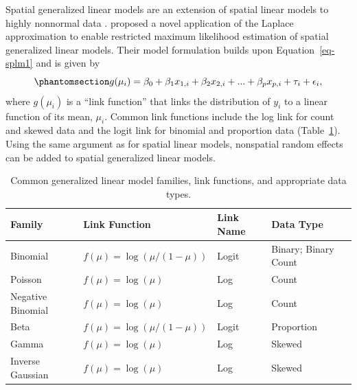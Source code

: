 \documentclass[
  letterpaper,
  DIV=11,
  numbers=noendperiod]{scrartcl}
\begin{document}
Spatial generalized linear models are an extension of spatial linear
models to highly nonnormal data
\citep{christensen2002bayesian, zhang2002estimation, diggle2007model, bonat2016practical}.
\citet{verhoef2024marginal} proposed a novel application of the Laplace
approximation to enable restricted maximum likelihood estimation of
spatial generalized linear models. Their model formulation builds upon
Equation~\ref{eq-splm1} and is given by
\begin{equation}\phantomsection\label{eq-spglm1}{
g(\mu_i) = \beta_0 + \beta_1x_{1, i} + \beta_2x_{2, i} + ... + \beta_p x_{p, i} + \tau_i + \epsilon_i,
}\end{equation} where \(g(\mu_i)\) is a ``link function'' that links the
distribution of \(y_i\) to a linear function of its mean, \(\mu_i\).
Common link functions include the log link for count and skewed data and
the logit link for binomial and proportion data
(Table~\ref{tbl-glm-families}). Using the same argument as for spatial
linear models, nonspatial random effects can be added to spatial
generalized linear models.

\begin{longtable}[]{@{}
  >{\raggedright\arraybackslash}p{}
  >{\raggedright\arraybackslash}p{}
  >{\raggedright\arraybackslash}p{}
  >{\raggedright\arraybackslash}p{}@{}}

\caption{\label{tbl-glm-families}Common generalized linear model
families, link functions, and appropriate data types.}

\tabularnewline

\toprule\noalign{}
\begin{minipage}[b]{\linewidth}\raggedright
Family
\end{minipage} & \begin{minipage}[b]{\linewidth}\raggedright
Link Function
\end{minipage} & \begin{minipage}[b]{\linewidth}\raggedright
Link Name
\end{minipage} & \begin{minipage}[b]{\linewidth}\raggedright
Data Type
\end{minipage} \\
\midrule\noalign{}
\endhead
\bottomrule\noalign{}
\endlastfoot
Binomial & \(f(\mu) = \log(\mu / (1 - \mu))\) & Logit & Binary; Binary
Count \\
Poisson & \(f(\mu) = \log(\mu)\) & Log & Count \\
Negative Binomial & \(f(\mu) = \log(\mu)\) & Log & Count \\
Beta & \(f(\mu) = \log(\mu / (1 - \mu))\) & Logit & Proportion \\
Gamma & \(f(\mu) = \log(\mu)\) & Log & Skewed \\
Inverse Gaussian & \(f(\mu) = \log(\mu)\) & Log & Skewed \\

\end{longtable}
\end{document}

